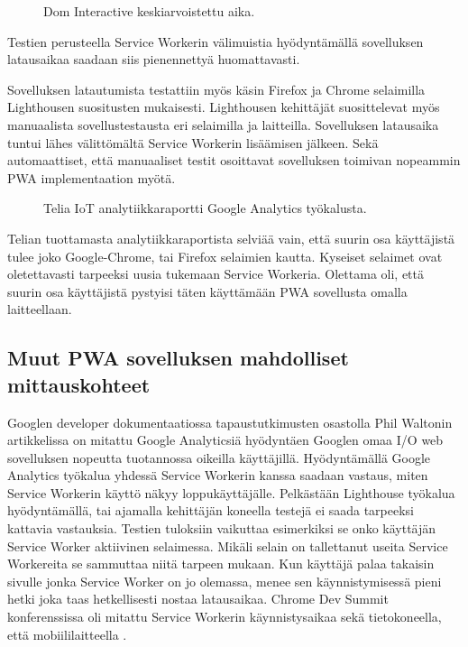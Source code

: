 \documentclass{tktltiki}
\begin{document}
\begin{figure}[!h]
\begin{center}
\caption{Dom Interactive keskiarvoistettu aika.}
\label{Dom Interactive keskiarvoistettu aika}
\end{center}
\end{figure}

Testien perusteella Service Workerin välimuistia hyödyntämällä sovelluksen latausaikaa saadaan siis pienennettyä huomattavasti. 

Sovelluksen latautumista testattiin myös käsin Firefox ja Chrome selaimilla Lighthousen suositusten mukaisesti. Lighthousen kehittäjät suosittelevat myös manuaalista sovellustestausta eri selaimilla ja laitteilla. Sovelluksen latausaika tuntui lähes välittömältä Service Workerin lisäämisen jälkeen. Sekä automaattiset, että manuaaliset testit osoittavat sovelluksen toimivan nopeammin PWA implementaation myötä. 

\begin{figure}[!h]
\begin{center}
\caption{Telia IoT analytiikkaraportti Google Analytics työkalusta.}
\label{Google Analytics raportti Telia IoT}
\end{center}
\end{figure}

Telian tuottamasta analytiikkaraportista selviää vain, että suurin osa käyttäjistä tulee joko Google-Chrome, tai Firefox selaimien kautta. Kyseiset selaimet ovat oletettavasti tarpeeksi uusia tukemaan Service Workeria. Olettama oli, että suurin osa käyttäjistä pystyisi täten käyttämään PWA sovellusta omalla laitteellaan. 

\clearpage

\subsection{Muut PWA sovelluksen mahdolliset mittauskohteet}

Googlen developer dokumentaatiossa tapaustutkimusten osastolla Phil Waltonin artikkelissa \cite{Walton} on mitattu Google Analyticsiä hyödyntäen Googlen omaa I/O web sovelluksen nopeutta tuotannossa oikeilla käyttäjillä. Hyödyntämällä Google Analytics työkalua yhdessä Service Workerin kanssa saadaan vastaus, miten Service Workerin käyttö näkyy loppukäyttäjälle. Pelkästään Lighthouse työkalua hyödyntämällä, tai ajamalla kehittäjän koneella testejä ei saada tarpeeksi kattavia vastauksia. Testien tuloksiin vaikuttaa esimerkiksi se onko käyttäjän Service Worker aktiivinen selaimessa. Mikäli selain on tallettanut useita Service Workereita se sammuttaa niitä tarpeen mukaan. Kun käyttäjä palaa takaisin sivulle jonka Service Worker on jo olemassa, menee sen käynnistymisessä pieni hetki joka taas hetkellisesti nostaa latausaikaa. Chrome Dev Summit konferenssissa oli mitattu Service Workerin käynnistysaikaa sekä tietokoneella, että mobiililaitteella \cite{GoogleDevSummit}. 
\end{document}
